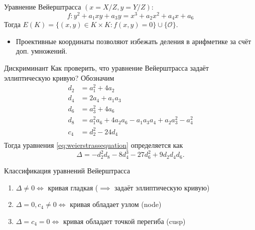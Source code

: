 \documentclass{beamer}
\begin{document}
\begin{frame} 
Уравнение Вейерштрасса  $(x=X/Z, y=Y/Z)$:
      \begin{equation}\label{eq:weierstrassequation}
            f: y^2+a_1xy + a_3y = x^3 + a_2x^2 + a_4x + a_6
        \end{equation}
        Тогда $E(K) = \{ (x,y) \in K \times K: f(x,y)=0 \} \cup \{\mathcal{O}\}$.
    
    \begin{itemize}
        \item Проективные координаты позволяют избежать деления в арифметике за счёт доп. умножений.
    \end{itemize}
\end{frame}

\begin{frame}{Дискриминант}
    Как проверить, что уравнение Вейерштрасса задаёт эллиптическую кривую? Обозначим
    \begin{equation}
        \begin{split}
            d_2 &= a_1^2 + 4a_2 \\
            d_4 &= 2a_4 + a_1a_3 \\
            d_6 &= a_3^2 + 4a_6 \\
            d_8 &= a_1^2a_6 + 4a_2a_6 - a_1a_3a_4 + a_2a_3^2 - a_4^2 \\
            c_4 &= d_2^2 - 24d_4 \\
        \end{split}
    \end{equation}
    Тогда  уравнения \eqref{eq:weierstrassequation} определяется как 
    \[
    \Delta = -d_2^2d_8 - 8d_4^3-27d_6^2+9d_2d_4d_6.
    \]
\end{frame}


\begin{frame}{Классификация уравнений Вейерштрасса}
    \begin{tcolorbox}[colframe=title-and-section-color!120, colback=title-and-section-color!5, title=Теорема \text{[Silverman, Thm. 1.4]}, center title]
        \begin{enumerate}
            \item $\Delta \neq 0 \iff$ кривая гладкая ($\implies$ задаёт эллиптическую кривую) 
            \item $\Delta = 0, c_4 \neq 0 \iff$ кривая обладает узлом (node) 
            \item $\Delta = c_4 = 0 \iff$ кривая обладает точкой перегиба (cusp)
        \end{enumerate}
    \end{tcolorbox}
\end{frame}
\end{document}
